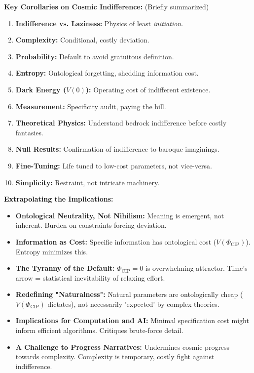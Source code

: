 \documentclass[11pt, a4paper]{article}
\newcommand{\subt}[1]{\mathrm{#1}}
\begin{document}
{{{\textbf{Key Corollaries on Cosmic Indifference:} (Briefly summarized)
\begin{enumerate} \itemsep0em
    \item \textbf{Indifference vs. Laziness:} Physics of least \textit{initiation}.
    \item \textbf{Complexity:} Conditional, costly deviation.
    \item \textbf{Probability:} Default to avoid gratuitous definition.
    \item \textbf{Entropy:} Ontological forgetting, shedding information cost.
    \item \textbf{Dark Energy ($V(0)$):} Operating cost of indifferent existence.
    \item \textbf{Measurement:} Specificity audit, paying the bill.
    \item \textbf{Theoretical Physics:} Understand bedrock indifference before costly fantasies.
    \item \textbf{Null Results:} Confirmation of indifference to baroque imaginings.
    \item \textbf{Fine-Tuning:} Life tuned to low-cost parameters, not vice-versa.
    \item \textbf{Simplicity:} Restraint, not intricate machinery.
\end{enumerate}

\textbf{Extrapolating the Implications:}
\begin{itemize}
    \item \textbf{Ontological Neutrality, Not Nihilism:} Meaning is emergent, not inherent. Burden on constraints forcing deviation.
    \item \textbf{Information as Cost:} Specific information has ontological cost ($V(\Phi_{\subt{CIP}})$). Entropy minimizes this.
    \item \textbf{The Tyranny of the Default:} $\Phi_{\subt{CIP}} = 0$ is overwhelming attractor. Time's arrow = statistical inevitability of relaxing effort.
    \item \textbf{Redefining "Naturalness":} Natural parameters are ontologically cheap ($V(\Phi_{\subt{CIP}})$ dictates), not necessarily 'expected' by complex theories.
    \item \textbf{Implications for Computation and AI:} Minimal specification cost might inform efficient algorithms. Critiques brute-force detail.
    \item \textbf{A Challenge to Progress Narratives:} Undermines cosmic progress towards complexity. Complexity is temporary, costly fight against indifference.
\end{itemize}

}}}
\end{document}
